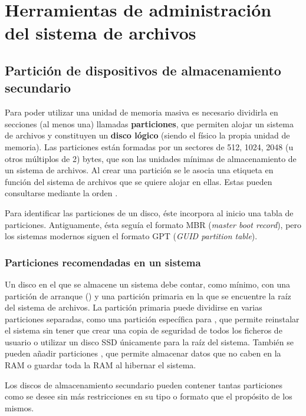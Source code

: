 \section{Herramientas de administración del sistema de archivos}

\subsection{Partición de dispositivos de almacenamiento secundario}

Para poder utilizar una unidad de memoria masiva es necesario dividirla en secciones (al menos una) llamadas \textbf{particiones}, que permiten alojar un sistema de archivos y constituyen un \textbf{disco lógico} (siendo el físico la propia unidad de memoria).
Las particiones están formadas por un sectores de 512, 1024, 2048 (u otros múltiplos de 2) bytes, que son las unidades mínimas de almacenamiento de un sistema de archivos.
Al crear una partición se le asocia una etiqueta en función del sistema de archivos que se quiere alojar en ellas.
Estas pueden consultarse mediante la orden .

Para identificar las particiones de un disco, éste incorpora al inicio una tabla de particiones.
Antiguamente, ésta seguía el formato MBR (\emph{master boot record}), pero los sistemas modernos siguen el formato GPT (\emph{GUID partition table}).

\subsubsection{Particiones recomendadas en un sistema}

Un disco en el que se almacene un sistema debe contar, como mínimo, con una partición de arranque () y una partición primaria en la que se encuentre la raíz del sistema de archivos.
La partición primaria puede dividirse en varias particiones separadas, como una partición específica para , que permite reinstalar el sistema sin tener que crear una copia de seguridad de todos los ficheros de usuario o utilizar un disco SSD únicamente para la raíz del sistema.
También se pueden añadir particiones , que permite almacenar datos que no caben en la RAM o guardar toda la RAM al hibernar el sistema.

Los discos de almacenamiento secundario pueden contener tantas particiones como se desee sin más restricciones en su tipo o formato que el propósito de los mismos.

